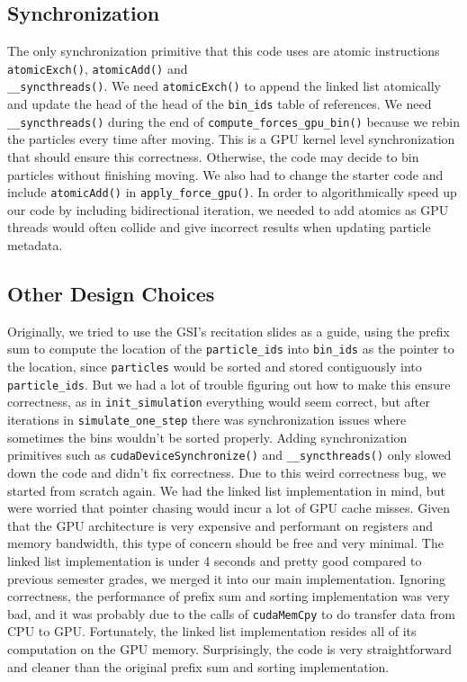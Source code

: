 \documentclass{article}
\begin{document}
\subsection{Synchronization}
The only synchronization primitive that this code uses are atomic instructions \verb|atomicExch()|, \verb|atomicAdd()| and \\ \verb|__syncthreads()|. We need \verb|atomicExch()| to append the linked list atomically and update the head of the head of the \verb|bin_ids| table of references. We need \verb|__syncthreads()| during the end of \verb|compute_forces_gpu_bin()| because we rebin the particles every time after moving. This is a GPU kernel level synchronization that should ensure this correctness. Otherwise, the code may decide to bin particles without finishing moving. We also had to change the starter code and include \verb|atomicAdd()| in \verb|apply_force_gpu()|. In order to algorithmically speed up our code by including bidirectional iteration, we needed to add atomics as GPU threads would often collide and give incorrect results when updating particle metadata. 

\subsection{Other Design Choices}
Originally, we tried to use the GSI's recitation slides as a guide, using the prefix sum to compute the location of the \verb|particle_ids| into \verb|bin_ids| as the pointer to the location, since \verb|particles| would be sorted and stored contiguously into \verb|particle_ids|. But we had a lot of trouble figuring out how to make this ensure correctness, as in \verb|init_simulation| everything would seem correct, but after iterations in \verb|simulate_one_step|  there was synchronization issues where sometimes the bins wouldn't be sorted properly. Adding synchronization primitives such as \verb|cudaDeviceSynchronize()| and \verb|__syncthreads()| only slowed down the code and didn't fix correctness. Due to this weird correctness bug, we started from scratch again. We had the linked list implementation in mind, but were worried that pointer chasing would incur a lot of GPU cache misses. Given that the GPU architecture is very expensive and performant on registers and memory bandwidth, this type of concern should be free and very minimal. The linked list implementation is under 4 seconds and pretty good compared to previous semester grades, we merged it into our main implementation. Ignoring correctness, the performance of prefix sum and sorting implementation was very bad, and it was probably due to the calls of \verb|cudaMemCpy| to do transfer data from CPU to GPU. Fortunately, the linked list implementation resides all of its computation on the GPU memory. Surprisingly, the code is very straightforward and cleaner than the original prefix sum and sorting implementation.
\end{document}
